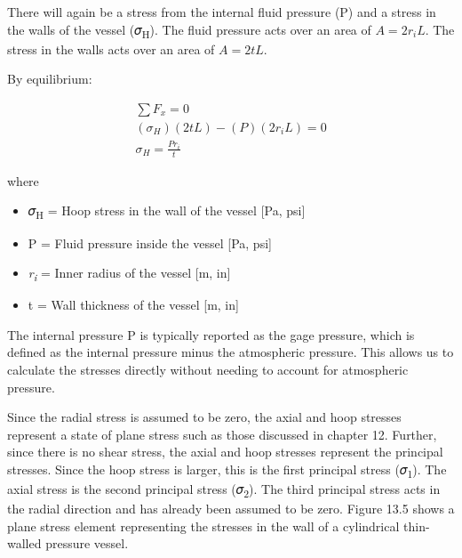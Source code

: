 \documentclass[
  letterpaper,
  DIV=11,
  numbers=noendperiod]{scrreprt}
\begin{document}
There will again be a stress from the internal fluid pressure (P) and a
stress in the walls of the vessel (𝜎\textsubscript{H}). The fluid
pressure acts over an area of \(A=2 r_i L\). The stress in the walls
acts over an area of \(A=2 t L\).

By equilibrium:

\[
\begin{gathered}
\sum F_x=0 \\
\left(\sigma_H\right)(2 t L)-(P)\left(2 r_i L\right)=0 \\
\sigma_H=\frac{P r_i}{t}
\end{gathered}
\]

where

\begin{itemize}
\item
  𝜎\textsubscript{H} = Hoop stress in the wall of the vessel {[}Pa,
  psi{]}
\item
  P = Fluid pressure inside the vessel {[}Pa, psi{]}
\item
  \emph{r\textsubscript{i}} = Inner radius of the vessel {[}m, in{]}
\item
  t = Wall thickness of the vessel {[}m, in{]}
\end{itemize}

The internal pressure P is typically reported as the gage pressure,
which is defined as the internal pressure minus the atmospheric
pressure. This allows us to calculate the stresses directly without
needing to account for atmospheric pressure.

Since the radial stress is assumed to be zero, the axial and hoop
stresses represent a state of plane stress such as those discussed in
chapter 12. Further, since there is no shear stress, the axial and hoop
stresses represent the principal stresses. Since the hoop stress is
larger, this is the first principal stress (𝜎\textsubscript{1}). The
axial stress is the second principal stress (𝜎\textsubscript{2}). The
third principal stress acts in the radial direction and has already been
assumed to be zero. Figure 13.5 shows a plane stress element
representing the stresses in the wall of a cylindrical thin-walled
pressure vessel.
\end{document}
